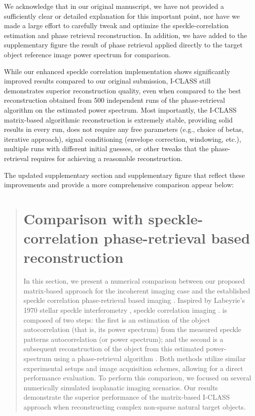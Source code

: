 \documentclass[12pt]{article}
\newenvironment{finished_ourresponse}
    {\begin{tcolorbox}[width=\linewidth,breakable,enhanced,colback=gray!5,colframe=finished_responsecolor!50,title=Response,left=5pt,right=5pt]}
    {\end{tcolorbox}}
\begin{document}
\begin{finished_ourresponse}
    We acknowledge that in our original manuscript, we have not provided a sufficiently clear or detailed explanation for this important point, nor have we made a large effort to carefully tweak and optimize the speckle-correlation estimation and phase retrieval reconstruction. In addition, we have added to the supplementary figure the result of phase retrieval applied directly to the target object reference image power spectrum for comparison. 
    
    While our enhanced speckle correlation implementation shows significantly improved results compared to our original submission, I-CLASS still demonstrates superior reconstruction quality, even when compared to the best reconstruction obtained from 500 independent runs of the phase-retrieval algorithm on the estimated power spectrum. Most importantly, the I-CLASS matrix-based algorithmic reconstruction is extremely stable, providing solid results in every run, does not require any free parameters (e.g., choice of betas, iterative approach), signal conditioning (envelope correction, windowing, etc.), multiple runs with different initial guesses, or other tweaks that the phase-retrieval requires for achieving a reasonable reconstruction. 
    
     The updated supplementary section and supplementary figure that reflect these improvements and provide a more comprehensive comparison appear below:

    \begin{quote}
    {\bfseries
        \setcounter{section}{2}
        \section{Comparison with speckle-correlation phase-retrieval based reconstruction}

        In this section, we present a numerical comparison between our proposed matrix-based approach for the incoherent imaging case and the established speckle correlation phase-retrieval based imaging  \cite{bert12, katz14}. Inspired by Labeyrie's 1970 stellar speckle interferometry \cite{labeyrie1970attainment}, speckle correlation imaging \cite{bert12, katz14}. is composed of two steps: the first is an estimation of the object autocorrelation (that is, its power spectrum) from the measured speckle patterns autocorrelation (or power spectrum); and the second is a subsequent reconstruction of the object from this estimated power-spectrum using a phase-retrieval algorithm \cite{fienup1982phase}. 
        Both methods utilize similar experimental setups and image acquisition schemes, allowing for a direct performance evaluation. To perform this comparison, we focused on several numerically simulated isoplanatic imaging scenarios. Our results demonstrate the superior performance of the matrix-based I-CLASS approach when reconstructing complex non-sparse natural target objects. 
        
}
\end{quote}
\end{finished_ourresponse}
\end{document}
